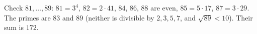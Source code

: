 Check $81,\ldots,89$: $81=3^4$, $82=2\cdot41$, $84$, $86$, $88$ are even, $85=5\cdot17$, $87=3\cdot29$. The primes are $83$ and $89$ (neither is divisible by $2,3,5,7$, and $\sqrt{89}<10$). Their sum is $\boxed{172}$.
